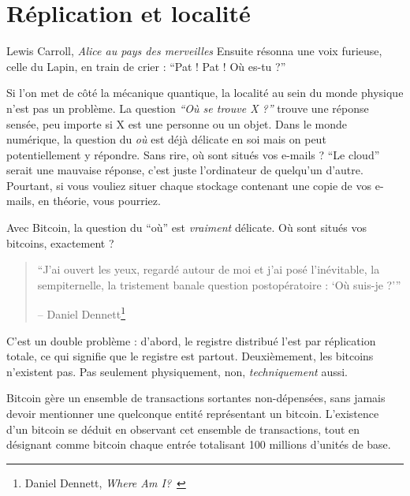 \chapter{Réplication et localité}
\label{les:3}

\begin{chapquote}{Lewis Carroll, \textit{Alice au pays des merveilles}}
Ensuite résonna une voix furieuse, celle du Lapin, en train de crier :
\enquote{Pat ! Pat ! Où es-tu ?}
\end{chapquote}

Si l'on met de côté la mécanique quantique, la localité au sein du monde
physique n'est pas un problème. La question \textit{\enquote{Où se trouve X ?}}
trouve une réponse sensée, peu importe si X est une personne ou un objet. Dans
le monde numérique, la question du \textit{où} est déjà délicate en soi mais on
peut potentiellement y répondre. Sans rire, où sont situés vos e-mails ?
\enquote{Le cloud} serait une mauvaise réponse, c'est juste l'ordinateur de
quelqu'un d'autre. Pourtant, si vous vouliez situer chaque stockage contenant
une copie de vos e-mails, en théorie, vous pourriez.

Avec Bitcoin, la question du \enquote{où} est \textit{vraiment} délicate. Où
sont situés vos bitcoins, exactement ?

\begin{quotation}\begin{samepage}
\enquote{J'ai ouvert les yeux, regardé autour de moi et j'ai posé l'inévitable,
la sempiternelle, la tristement banale question postopératoire : `Où suis-je ?'}
\begin{flushright} -- Daniel Dennett\footnote{Daniel Dennett, \textit{Where Am
I?}~\cite{where-am-i}}
\end{flushright}\end{samepage}\end{quotation}

C'est un double problème : d'abord, le registre distribué l'est par réplication
totale, ce qui signifie que le registre est partout. Deuxièmement, les bitcoins
n'existent pas. Pas seulement physiquement, non, \textit{techniquement} aussi.

Bitcoin gère un ensemble de transactions sortantes non-dépensées, sans jamais
devoir mentionner une quelconque entité représentant un bitcoin.
L'existence d'un bitcoin se déduit en observant cet ensemble de transactions,
tout en désignant comme bitcoin chaque entrée totalisant 100 millions d'unités
de base.

